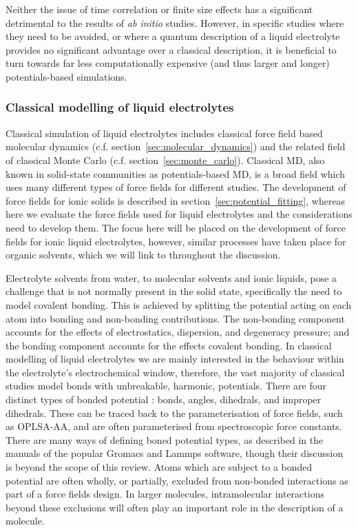 \documentclass[../main.tex]{subfiles}
\begin{document}
Neither the issue of time correlation or finite size effects has a significant detrimental to the results of \textit{ab initio} studies. However, in specific studies where they need to be avoided, or where a quantum description of a liquid electrolyte provides no significant advantage over a classical description, it is beneficial to turn towards far less computationally expensive (and thus larger and longer) potentials-based simulations.

\subsubsection{Classical modelling of liquid electrolytes}
Classical simulation of liquid electrolytes includes classical force field based molecular dynamics (c.f. section~\ref{sec:molecular_dynamics}) and the related field of classical Monte Carlo (c.f. section~\ref{sec:monte_carlo}). Classical MD, also known in solid-state communities as potentials-based MD, is a broad field which uses many different types of force fields for different studies. The development of force fields for ionic solids is described in section~\ref{sec:potential_fitting}, whereas here we evaluate the force fields used for liquid electrolytes and the considerations need to develop them. The focus here will be placed on the development of force fields for ionic liquid electrolytes, however, similar processes have taken place for organic solvents, which we will link to throughout the discussion.

Electrolyte solvents from water, to molecular solvents and ionic liquids, pose a challenge that is not normally present in the solid state, specifically the need to model covalent bonding. This is achieved by splitting the potential acting on each atom into bonding and non-bonding contributions. The non-bonding component accounts for the effects of electrostatics, dispersion, and degeneracy pressure; and the bonding component accounts for the effects covalent bonding. In classical modelling of liquid electrolytes we are mainly interested in the behaviour within the electrolyte's electrochemical window, therefore, the vast majority of classical studies model bonds with unbreakable, harmonic, potentials. There are four distinct types of bonded potential \cite{lindahl_gromacs_2021, frenkel_understanding_2002}: bonds, angles, dihedrals, and improper dihedrals. These can be traced back to the parameterisation of force fields, such as OPLSA-AA\cite{canongia_lopes_clp_2012,jorgensen_development_1996}, and are often parameterised from spectroscopic force constants. There are many ways of defining boned potential types, as described in the manuals of the popular Gromacs\cite{lindahl_gromacs_2021} and Lammps\cite{PLIMPTON19951} software, though their discussion is beyond the scope of this review. Atoms which are subject to a bonded potential are often wholly, or partially, excluded from non-bonded interactions as part of a force fields design. In larger molecules, intramolecular interactions beyond these exclusions will often play an important role in the description of a molecule.
\end{document}
